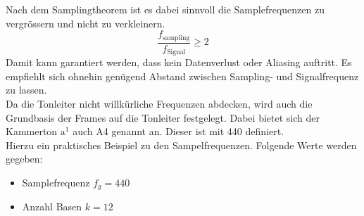 Nach dem Samplingtheorem ist es dabei sinnvoll die Samplefrequenzen zu vergrössern und nicht zu verkleinern.
\[ \frac{f_{\text{sampling}}}{f_{\text{Signal}}} \geq 2\]
Damit kann garantiert werden, dass kein Datenverlust oder Aliasing auftritt. Es empfiehlt sich ohnehin genügend Abstand zwischen Sampling- und Signalfrequenz zu lassen.\\

Da die Tonleiter nicht willkürliche Frequenzen abdecken, wird auch die Grundbasis der Frames auf die Tonleiter festgelegt. Dabei bietet sich der Kammerton $\text{a}^{1}$ auch A4 genannt an. Dieser ist mit 440 \text{[Hz]} definiert.\\




Hierzu ein praktisches Beispiel zu den Sampelfrequenzen. Folgende Werte werden gegeben:
\begin{itemize}
	\item Samplefrequenz $f_{g}=440$\text{[Hz]}
	\item Anzahl Basen $k=12$
\end{itemize}	

